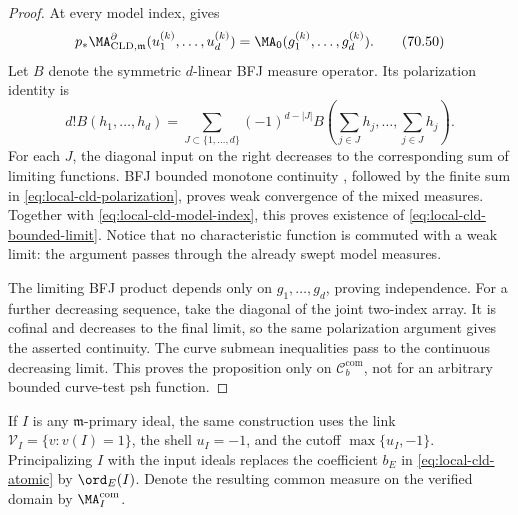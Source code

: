\begin{proof}
At every model index,  gives
\[
 p_*\MA^{\partial}_{\mathrm{CLD},\mathfrak m}
       (u_1^{(k)},\ldots,u_d^{(k)})
 =\MA_0(g_1^{(k)},\ldots,g_d^{(k)}).
\tag{70.50}\label{eq:local-cld-model-index}
\]
Let \(B\) denote the symmetric \(d\)-linear BFJ measure operator. Its
polarization identity is
\[
 d!B(h_1,\ldots,h_d)
 =\sum_{J\subset\{1,\ldots,d\}}(-1)^{d-|J|}
 B\!\left(\sum_{j\in J}h_j,\ldots,\sum_{j\in J}h_j\right).
\tag{70.51}\label{eq:local-cld-polarization}
\]
For each \(J\), the diagonal input on the right decreases to the
corresponding sum of limiting functions. BFJ bounded monotone continuity
\cite[Proposition~4.8]{BFJ08}, followed by the finite sum in
\eqref{eq:local-cld-polarization}, proves weak convergence of the mixed
measures. Together with \eqref{eq:local-cld-model-index}, this proves
existence of \eqref{eq:local-cld-bounded-limit}. Notice that no
characteristic function is commuted with a weak limit: the argument passes
through the already swept model measures.

The limiting BFJ product depends only on \(g_1,\ldots,g_d\), proving
independence. For a further decreasing sequence, take the diagonal of the
joint two-index array. It is cofinal and decreases to the final limit, so
the same polarization argument gives the asserted continuity. The curve
submean inequalities pass to the continuous decreasing limit. This proves
the proposition only on \(\mathcal C_b^{\mathrm{com}}\), not for an
arbitrary bounded curve-test psh function.
\end{proof}

If \(I\) is any \(\mathfrak m\)-primary ideal, the same construction uses
the link \(\mathcal V_I=\{v:v(I)=1\}\), the shell \(u_I=-1\), and the
cutoff \(\max\{u_I,-1\}\). Principalizing \(I\) with the input ideals
replaces the coefficient \(b_E\) in
\eqref{eq:local-cld-atomic} by \(\ord_E(I)\). Denote the resulting common
measure on the verified domain by \(\MA_I^{\mathrm{com}}\).

